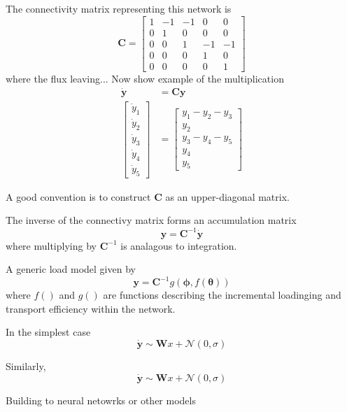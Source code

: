 \documentclass{article}
\begin{document}
The connectivity matrix representing this network is
\begin{equation}
  \pmb{C} = \begin{bmatrix}
    1 & -1 & -1 &  0 &  0 \\
    0 &  1 &  0 &  0 &  0 \\
    0 &  0 &  1 & -1 & -1 \\
    0 &  0 &  0 &  1 &  0 \\
    0 &  0 &  0 &  0 &  1
  \end{bmatrix}
\end{equation}
where the flux leaving...
Now show example of the multiplication
\begin{align}
  \pmb{\dot y} &= \pmb{C} \pmb{y} \\
  \begin{bmatrix}
    \dot y_1 \\
    \dot y_2 \\
    \dot y_3 \\
    \dot y_4 \\
    \dot y_5
  \end{bmatrix} &=
                  \begin{bmatrix}
                    y_1 - y_2 - y_3 \\
                    y_2 \\
                    y_3 - y_4 - y_5 \\
                    y_4 \\
                    y_5
                  \end{bmatrix}
\end{align}

A good convention is to construct $\pmb{C}$ as an upper-diagonal matrix.

The inverse of the connectivy matrix forms an accumulation matrix
\begin{equation}
\pmb{y} = \pmb{C}^{-1} \pmb{\dot y}
\end{equation}
where multiplying by $\pmb{C}^{-1}$ is analagous to integration.

A generic load model given by
\begin{equation}
  \pmb{y} = \pmb{C}^{-1} \textit{g}(\pmb{\phi}, \textit{f}(\pmb{\theta}))
\end{equation}
where $\textit{f}()$ and $\textit{g}()$ are functions describing the incremental loadinging and transport efficiency within the network.

In the simplest case
\begin{equation}
  \pmb{\dot y} \sim \pmb{W}x + \mathcal{N}(0, \sigma)
\end{equation}

Similarly,
\begin{equation}
  \pmb{\dot y} \sim \pmb{W}x + \mathcal{N}(0, \sigma)
\end{equation}

Building to neural netowrks or other models



\end{document}
